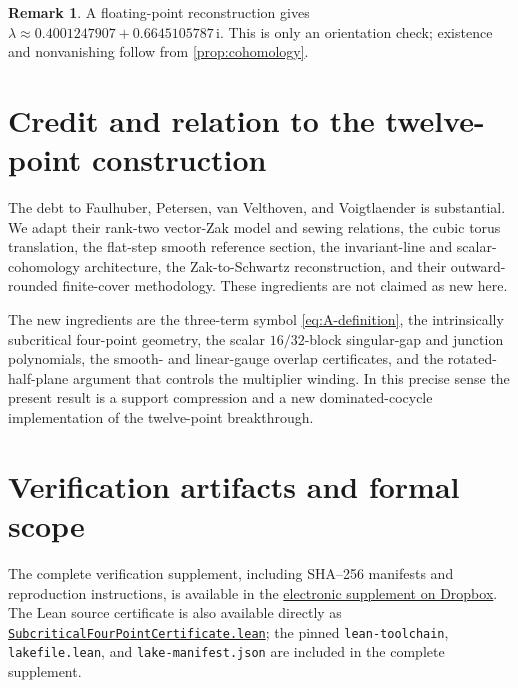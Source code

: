 \documentclass[11pt,reqno]{amsart}
\numberwithin{equation}{section}
\theoremstyle{definition}
\newtheorem{remark}[theorem]{Remark}
\newcommand{\ii}{\mathrm i}
\begin{document}
\begin{remark}
A floating-point reconstruction gives
$\lambda\approx0.4001247907+0.6645105787\,\ii$.  This is only an orientation
check; existence and nonvanishing follow from \cref{prop:cohomology}.
\end{remark}

\section{Credit and relation to the twelve-point construction}
\label{sec:provenance}

The debt to Faulhuber, Petersen, van Velthoven, and Voigtlaender
\cite{FPPV2026} is substantial.  We adapt their rank-two vector-Zak model and
sewing relations, the cubic torus translation, the flat-step smooth reference
section, the invariant-line and scalar-cohomology architecture, the
Zak-to-Schwartz reconstruction, and their outward-rounded finite-cover
methodology.  These ingredients are not claimed as new here.

The new ingredients are the three-term symbol \eqref{eq:A-definition}, the
intrinsically subcritical four-point geometry, the scalar $16/32$-block
singular-gap and junction polynomials, the smooth- and linear-gauge overlap
certificates, and the rotated-half-plane argument that controls the
multiplier winding.  In this precise sense the present result is a support
compression and a new dominated-cocycle implementation of the twelve-point
breakthrough.

\section{Verification artifacts and formal scope}
\label{sec:formal-scope}

The complete verification supplement, including SHA--256 manifests and
reproduction instructions, is available in the
\href{https://www.dropbox.com/scl/fo/zgsmpuar02zar5eayz1p3/AGHWT_hP_nLAFQBumvb-U7U?rlkey=i76xop0nhajwh7n1o0bzpaqf6\&dl=0}{electronic supplement on Dropbox}.
The Lean source certificate is also available directly as
\href{https://www.dropbox.com/scl/fi/foq7hpfwfd0sabm9ot462/SubcriticalFourPointCertificate.lean?rlkey=smt87jkdex7bkhezdrb942j8h\&dl=0}{\texttt{SubcriticalFourPointCertificate.lean}};
the pinned \texttt{lean-toolchain}, \texttt{lakefile.lean}, and
\texttt{lake-manifest.json} are included in the complete supplement.
\end{document}
